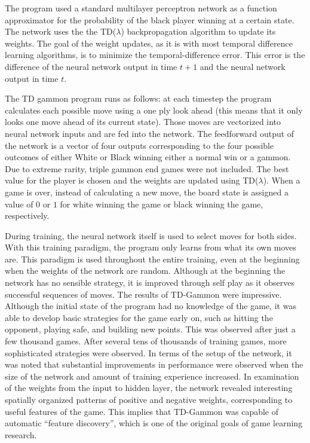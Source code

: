 \documentclass{sig-alternate-05-2015}
\begin{document}
The program used a standard multilayer perceptron network as a function approximator for the probability of the black player winning at a certain state. The network uses the the TD(\(\lambda\)) backpropagation algorithm to update its weights. The goal of the weight updates, as it is with most temporal difference learning algorithms, is to minimize the temporal-difference error. This error is the difference of the neural network output in time $t+1$ and the neural network output in time $t$. 

The TD gammon program runs as follows: at each timestep the program calculates each possible move using a one ply look ahead (this means that it only looks one move ahead of its current state). Those moves are vectorized into neural network inputs and are fed into the network. The feedforward output of the network is a vector of four outputs corresponding to the four possible outcomes of either White or Black winning either a normal win or a gammon. Due to extreme rarity, triple gammon end games were not included. The best value for the player is chosen and the weights are updated using TD(\(\lambda\)). When a game is over, instead of calculating a new move, the board state is assigned a value of $0$ or $1$ for white winning the game or black winning the game, respectively. 

During training, the neural network itself is used to select moves for both sides. With this training paradigm, the program only learns from what its own moves are. This paradigm is used throughout the entire training, even at the beginning when the weights of the network are random. Although at the beginning the network has no sensible strategy, it is improved through self play as it observes successful sequences of moves.
The results of TD-Gammon were impressive. Although the initial state of the program had no knowledge of the game, it was able to develop basic strategies for the game early on, such as hitting the opponent, playing safe, and building new points. This was observed after just a few thousand games. After several tens of thousands of training games, more sophisticated strategies were observed. In terms of the setup of the network, it was noted that substantial improvements in performance were observed when the size of the network and amount of training experience increased.
In examination of the weights from the input to hidden layer, the network revealed interesting spatially organized patterns of positive and negative weights, corresponding to useful features of the game. This implies that TD-Gammon was capable of automatic ``feature discovery'', which is one of the original goals of game learning research.
\end{document}
